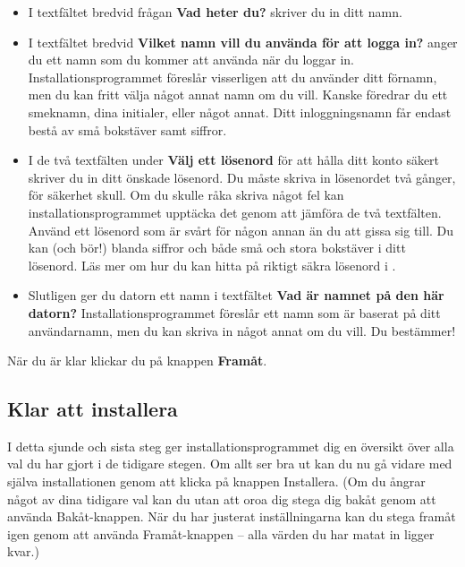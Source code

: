 \documentclass[a4paper,final]{memoir} %
\begin{document}
\begin{itemize}

\item I textfältet bredvid frågan \textbf{Vad heter du?} skriver du in ditt namn. 
\item I textfältet bredvid \textbf{Vilket namn vill du använda för att logga in?} anger du ett namn som du kommer att använda när du loggar in. Installationsprogrammet föreslår visserligen att du använder ditt förnamn, men du kan fritt välja något annat namn om du vill. Kanske föredrar du ett smeknamn, dina initialer, eller något annat. Ditt inloggningsnamn får endast bestå av små bokstäver samt siffror.
\item I de två textfälten under \textbf{Välj ett lösenord} för att hålla ditt konto säkert skriver du in ditt önskade lösenord. Du måste skriva in lösenordet två gånger, för säkerhet skull. Om du skulle råka skriva något fel kan installationsprogrammet upptäcka det genom att jämföra de två textfälten. Använd ett lösenord som är svårt för någon annan än du att gissa sig till. Du kan (och bör!) blanda siffror och både små och stora bokstäver i ditt lösenord. Läs mer om hur du kan hitta på riktigt säkra lösenord i .
\item Slutligen ger du datorn ett namn i textfältet \textbf{Vad är namnet på den här datorn?} Installationsprogrammet föreslår ett namn som är baserat på ditt användarnamn, men du kan skriva in något annat om du vill. Du bestämmer!

\end{itemize}

När du är klar klickar du på knappen \textbf{Framåt}.



\subsection{Klar att installera}

I detta sjunde och sista steg ger installationsprogrammet dig en översikt över alla val du har gjort i de tidigare stegen. Om allt ser bra ut kan du nu gå vidare med själva installationen genom att klicka på knappen Installera. (Om du ångrar något av dina tidigare val kan du utan att oroa dig stega dig bakåt genom att använda Bakåt-knappen. När du har justerat inställningarna kan du stega framåt igen genom att använda Framåt-knappen -- alla värden du har matat in ligger kvar.)
\end{document}
